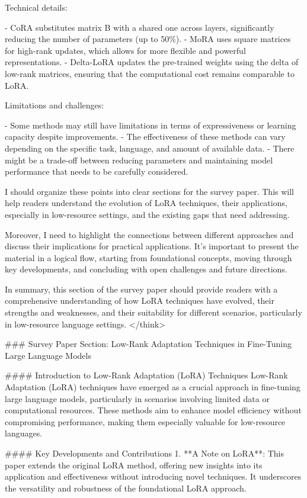 \documentclass[conference]{IEEEtran}
\begin{document}
Technical details:

- CoRA substitutes matrix B with a shared one across layers, significantly reducing the number of parameters (up to 50\%).
- MoRA uses square matrices for high-rank updates, which allows for more flexible and powerful representations.
- Delta-LoRA updates the pre-trained weights using the delta of low-rank matrices, ensuring that the computational cost remains comparable to LoRA.

Limitations and challenges:

- Some methods may still have limitations in terms of expressiveness or learning capacity despite improvements.
- The effectiveness of these methods can vary depending on the specific task, language, and amount of available data.
- There might be a trade-off between reducing parameters and maintaining model performance that needs to be carefully considered.

I should organize these points into clear sections for the survey paper. This will help readers understand the evolution of LoRA techniques, their applications, especially in low-resource settings, and the existing gaps that need addressing.

Moreover, I need to highlight the connections between different approaches and discuss their implications for practical applications. It's important to present the material in a logical flow, starting from foundational concepts, moving through key developments, and concluding with open challenges and future directions.

In summary, this section of the survey paper should provide readers with a comprehensive understanding of how LoRA techniques have evolved, their strengths and weaknesses, and their suitability for different scenarios, particularly in low-resource language settings.
</think>

### Survey Paper Section: Low-Rank Adaptation Techniques in Fine-Tuning Large Language Models

#### Introduction to Low-Rank Adaptation (LoRA) Techniques
Low-Rank Adaptation (LoRA) techniques have emerged as a crucial approach in fine-tuning large language models, particularly in scenarios involving limited data or computational resources. These methods aim to enhance model efficiency without compromising performance, making them especially valuable for low-resource languages.

#### Key Developments and Contributions
1. **A Note on LoRA**: This paper extends the original LoRA method, offering new insights into its application and effectiveness without introducing novel techniques. It underscores the versatility and robustness of the foundational LoRA approach.
   
\end{document}
